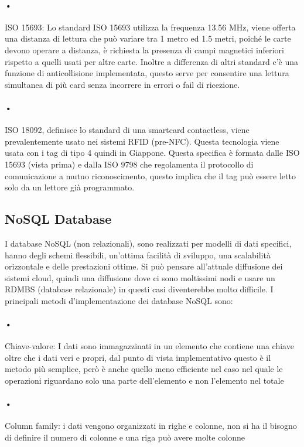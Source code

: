 \paragraph{•} ISO 15693: Lo standard ISO 15693 utilizza la frequenza 13.56 MHz, viene offerta una distanza di lettura che può variare tra 1 metro ed 1.5 metri, poiché le carte devono operare a distanza, è richiesta la presenza di campi magnetici inferiori rispetto a quelli usati per altre carte. Inoltre a differenza di altri standard c'è una funzione di anticollisione implementata, questo serve per consentire una lettura simultanea di più card senza incorrere in errori o fail di ricezione.
\paragraph{•} ISO 18092, definisce lo standard di una smartcard contactless, viene prevalentemente usato nei sistemi RFID (pre-NFC). Questa tecnologia  viene usata con i tag di tipo 4 quindi in Giappone. Questa specifica è formata dalle ISO 15693 (vista prima) e dalla ISO 9798 che regolamenta il protocollo di comunicazione a mutuo riconoscimento, questo implica che il tag può essere letto solo da un lettore già programmato.

\subsection{NoSQL Database}
\hspace{\parindent} I database NoSQL (non relazionali), sono realizzati per modelli di dati specifici, hanno degli schemi flessibili, un'ottima facilità di sviluppo, una scalabilità orizzontale e delle prestazioni ottime. Si può pensare all'attuale diffusione dei sistemi cloud, quindi una diffusione dove ci sono moltissimi nodi e usare un RDMBS (database relazionale) in questi casi diventerebbe molto difficile. I principali metodi d'implementazione dei database NoSQL sono:
\paragraph{•}Chiave-valore: I dati sono immagazzinati in un elemento che contiene una chiave oltre che i dati veri e propri, dal punto di vista implementativo questo è il metodo più semplice, però è anche quello meno efficiente nel caso nel quale le operazioni riguardano solo una parte dell'elemento e non l'elemento nel totale 
\paragraph{•}Column family: i dati vengono organizzati in righe e colonne, non si ha il bisogno di definire il numero di colonne e una riga può avere molte colonne
